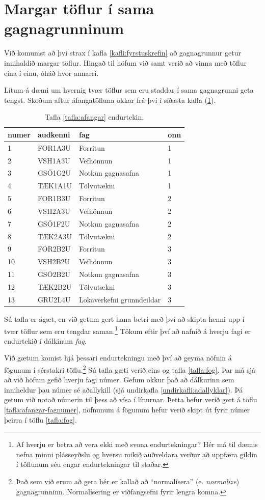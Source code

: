 \section{Margar töflur í sama gagnagrunninum}
Við komumst að því strax í kafla \ref{kafli:fyrstuskrefin} að gagnagrunnur getur innihaldið margar töflur. Hingað til höfum við samt verið að vinna með töflur eina í einu, óháð hvor annarri.

Lítum á dæmi um hvernig tvær töflur sem eru staddar í sama gagnagrunni geta tengst. Skoðum aftur áfangatöfluna okkar frá því í síðasta kafla (\ref{tafla:afangar-aftur}).

\begin{table}
\centering
\caption[Áfangar]{Tafla \ref{tafla:afangar} endurtekin.}
\label{tafla:afangar-aftur}
\begin{tabular}{llll}
\toprule
numer&audkenni&fag&onn\\
\midrule
1&	FOR1A3U&	Forritun&		1\\
2&	VSH1A3U&	Vefhönnun&		1\\
3&	GSÖ1G2U&	Notkun gagnasafna&	1\\
4&	TÆK1A1U&	Tölvutækni&		1\\
5&	FOR1B3U&	Forritun&		2\\
6&	VSH2A3U&	Vefhönnun&		2\\
7&	GSÖ1F2U&	Notkun gagnasafna&	2\\
8&	TÆK2A3U&	Tölvutækni&		2\\
9&	FOR2B2U&	Forritun&		3\\
10&	VSH2B2U&	Vefhönnun&		3\\
11&	GSÖ2B2U&	Notkun gagnasafna&	3\\
12&	TÆK2B2U&	Tölvutækni&		3\\
13&	GRU2L4U&	Lokaverkefni grunndeildar&3\\
\bottomrule
\end{tabular}
\end{table}

Sú tafla er ágæt, en við getum gert hana betri með því að skipta henni upp í tvær töflur sem eru tengdar saman.\footnote{Af hverju er betra að vera ekki með svona endurtekningar? Hér má til dæmis nefna minni plásseyðslu og hversu mikið auðveldara verður að uppfæra gildin í töflunum séu engar endurtekningar til staðar.} Tökum eftir því að nafnið á hverju fagi er endurtekið í dálkinum \emph{fag}. 

Við gætum komist hjá þessari endurtekningu með því að geyma nöfnin á fögunum í sérstakri töflu.\footnote{Það sem við erum að gera hér er kallað að ``normalísera'' (e. \emph{normalize}) gagnagrunninn. Normalísering er viðfangsefni fyrir lengra komna.} Sú tafla gæti verið eins og tafla \ref{tafla:fog}.
Þar má sjá að við höfum gefið hverju fagi númer. Gefum okkur það að dálkurinn sem inniheldur þau númer sé aðallykill (sjá undirkafla \ref{undirkafli:adallyklar}). Þá getum við notað númerin til þess að vísa í línurnar. Þetta hefur verið gert á töflu \ref{tafla:afangar-fagnumer}, nöfnunum á fögunum hefur verið skipt út fyrir númer þeirra í töflu \ref{tafla:fog}.

